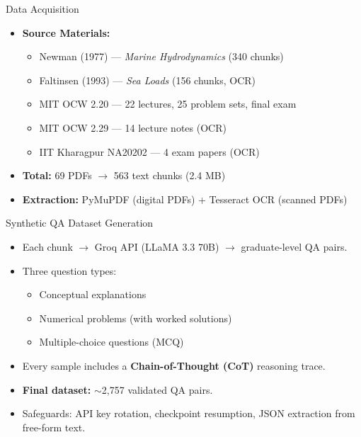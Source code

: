 \documentclass[10pt]{beamer}
\begin{document}
\begin{frame}{Data Acquisition}
\large
\begin{itemize}
    \item \textbf{Source Materials:}
    \begin{itemize}
        \item Newman (1977) — \textit{Marine Hydrodynamics} (340 chunks)
        \item Faltinsen (1993) — \textit{Sea Loads} (156 chunks, OCR)
        \item MIT OCW 2.20 — 22 lectures, 25 problem sets, final exam
        \item MIT OCW 2.29 — 14 lecture notes (OCR)
        \item IIT Kharagpur NA20202 — 4 exam papers (OCR)
    \end{itemize}
    \vspace{0.2cm}
    \item \textbf{Total:} 69 PDFs $\to$ 563 text chunks (2.4 MB)
    \vspace{0.2cm}
    \item \textbf{Extraction:} PyMuPDF (digital PDFs) + Tesseract OCR (scanned PDFs)
\end{itemize}
\end{frame}

\begin{frame}{Synthetic QA Dataset Generation}
\large
\begin{itemize}
    \item Each chunk $\to$ Groq API (LLaMA 3.3 70B) $\to$ graduate-level QA pairs.
    \vspace{0.2cm}
    \item Three question types:
    \begin{itemize}
        \item Conceptual explanations
        \item Numerical problems (with worked solutions)
        \item Multiple-choice questions (MCQ)
    \end{itemize}
    \vspace{0.2cm}
    \item Every sample includes a \textbf{Chain-of-Thought (CoT)} reasoning trace.
    \vspace{0.2cm}
    \item \textbf{Final dataset:} $\sim$2,757 validated QA pairs.
    \vspace{0.2cm}
    \item Safeguards: API key rotation, checkpoint resumption, JSON extraction from free-form text.
\end{itemize}
\end{frame}
\end{document}
